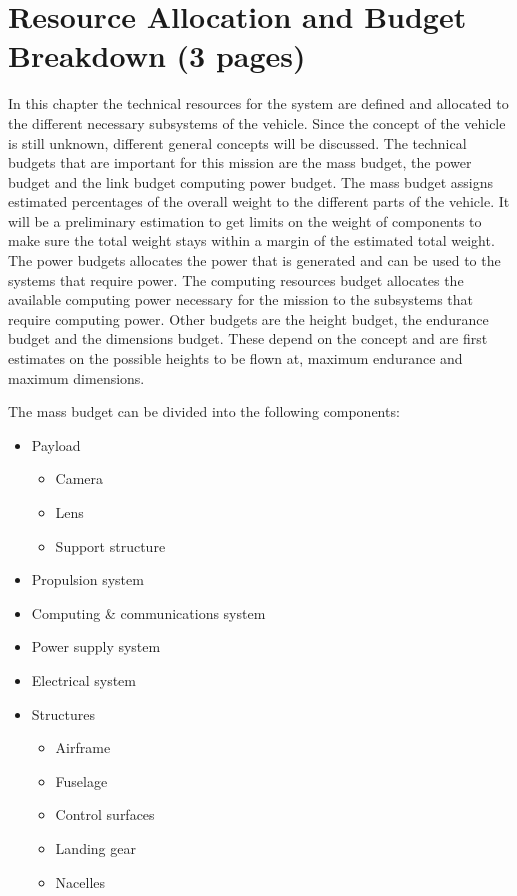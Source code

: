 \documentclass[a4paper]{report}
\begin{document}
\chapter{Resource Allocation and Budget Breakdown (3 pages)}\label{chap:RABB}

In this chapter the technical resources for the system are defined and allocated to the different necessary subsystems of the vehicle. Since the concept of the vehicle is still unknown, different general concepts will be discussed. The technical budgets that are important for this mission are the mass budget, the power budget and the link budget computing power budget. The mass budget assigns estimated percentages of the overall weight to the different parts of the vehicle. It will be a preliminary estimation to get limits on the weight of components to make sure the total weight stays within a margin of the estimated total weight. The power budgets allocates the power that is generated and can be used to the systems that require power. The computing resources budget allocates the available computing power necessary for the mission to the subsystems that require computing power. Other budgets are the height budget, the endurance budget and the dimensions budget. These depend on the concept and are first estimates on the possible heights to be flown at, maximum endurance and maximum dimensions.

The mass budget can be divided into the following components:
\begin{itemize}
\item Payload
\begin{itemize}
\item Camera
\item Lens
\item Support structure
\end{itemize}
\item Propulsion system
\item Computing & communications system
\item Power supply system
\item Electrical system
\item Structures
\begin{itemize}
\item Airframe
\item Fuselage
\item Control surfaces
\item Landing gear
\item Nacelles
\end{itemize}
\end{itemize}
\end{document}
